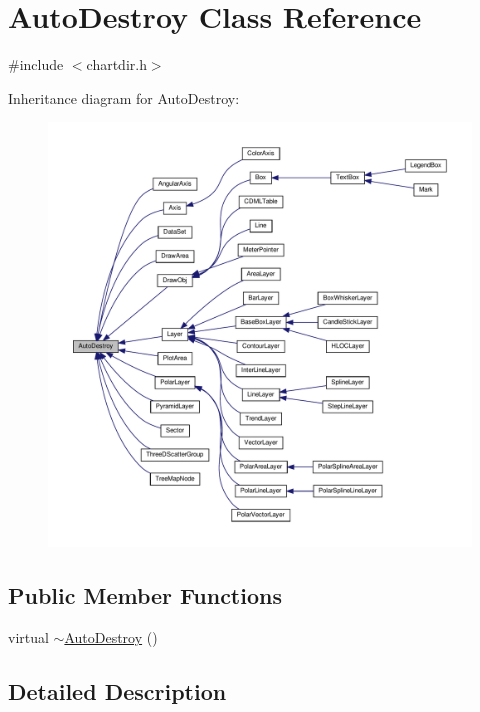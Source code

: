 \hypertarget{class_auto_destroy}{}\section{Auto\+Destroy Class Reference}
\label{class_auto_destroy}


{\ttfamily \#include $<$chartdir.\+h$>$}



Inheritance diagram for Auto\+Destroy\+:
\nopagebreak
\begin{figure}[H]
\begin{center}
\leavevmode
\includegraphics[width=350pt]{class_auto_destroy__inherit__graph}
\end{center}
\end{figure}
\subsection*{Public Member Functions}
\begin{DoxyCompactItemize}
\item 
virtual \hyperlink{class_auto_destroy_a58da3c9b1bfebfe2c2085a4792fabd27}{$\sim$\+Auto\+Destroy} ()
\end{DoxyCompactItemize}


\subsection{Detailed Description}


